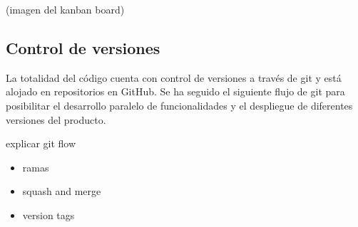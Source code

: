 (imagen del kanban board)

\subsection{Control de versiones}
La totalidad del código cuenta con control de versiones a través de git y está alojado en repositorios en GitHub. Se ha seguido el siguiente flujo de git para posibilitar el desarrollo paralelo de funcionalidades y el despliegue de diferentes versiones del producto.

explicar git flow

\begin{itemize}
    \item ramas
    \item squash and merge
    \item version tags
\end{itemize}